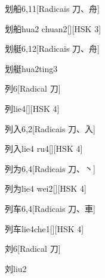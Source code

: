 \begin{entry}{划船}{6,11}[Radicais ⼑、⾈]
  \begin{phonetics}{划船}{hua2 chuan2}[][HSK 3]
  \end{phonetics}
\end{entry}

\begin{entry}{划艇}{6,12}[Radicais ⼑、⾈]
  \begin{phonetics}{划艇}{hua2ting3}
  \end{phonetics}
\end{entry}

\begin{entry}{列}{6}[Radical ⼑]
  \begin{phonetics}{列}{lie4}[][HSK 4]
  \end{phonetics}
\end{entry}

\begin{entry}{列入}{6,2}[Radicais ⼑、⼊]
  \begin{phonetics}{列入}{lie4 ru4}[][HSK 4]
  \end{phonetics}
\end{entry}

\begin{entry}{列为}{6,4}[Radicais ⼑、⼂]
  \begin{phonetics}{列为}{lie4 wei2}[][HSK 4]
  \end{phonetics}
\end{entry}

\begin{entry}{列车}{6,4}[Radicais ⼑、⾞]
  \begin{phonetics}{列车}{lie4che1}[][HSK 4]
  \end{phonetics}
\end{entry}

\begin{entry}{刘}{6}[Radical ⼑]
  \begin{phonetics}{刘}{liu2}
  \end{phonetics}
\end{entry}

